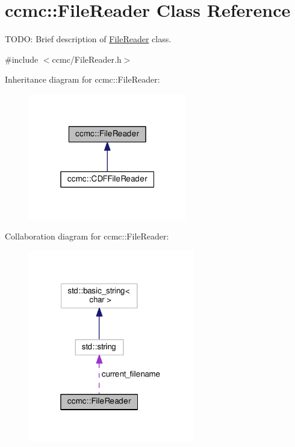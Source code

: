 \hypertarget{classccmc_1_1_file_reader}{\section{ccmc\-:\-:File\-Reader Class Reference}
\label{classccmc_1_1_file_reader}
}


T\-O\-D\-O\-: Brief description of \hyperlink{classccmc_1_1_file_reader}{File\-Reader} class.  




{\ttfamily \#include $<$ccmc/\-File\-Reader.\-h$>$}



Inheritance diagram for ccmc\-:\-:File\-Reader\-:
\nopagebreak
\begin{figure}[H]
\begin{center}
\leavevmode
\includegraphics[width=196pt]{classccmc_1_1_file_reader__inherit__graph}
\end{center}
\end{figure}


Collaboration diagram for ccmc\-:\-:File\-Reader\-:
\nopagebreak
\begin{figure}[H]
\begin{center}
\leavevmode
\includegraphics[width=205pt]{classccmc_1_1_file_reader__coll__graph}
\end{center}
\end{figure}
